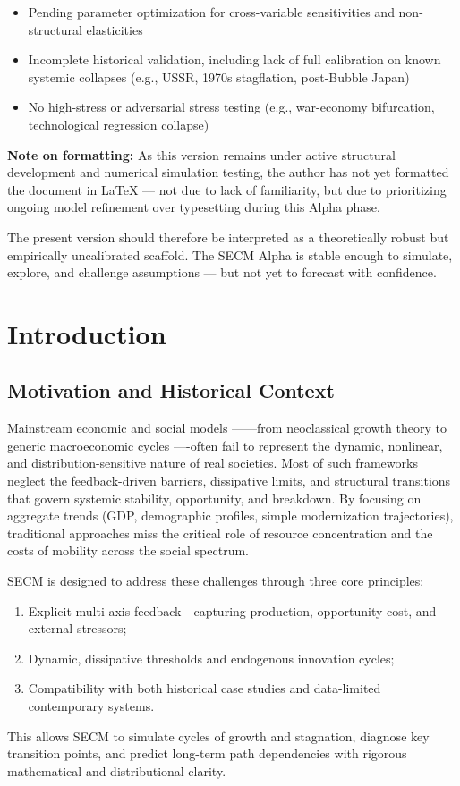 \documentclass[12pt]{report}
\begin{document}
\begin{itemize}
    \item Pending parameter optimization for cross-variable sensitivities and non-structural elasticities
    \item Incomplete historical validation, including lack of full calibration on known systemic collapses (e.g., USSR, 1970s stagflation, post-Bubble Japan)
    \item No high-stress or adversarial stress testing (e.g., war-economy bifurcation, technological regression collapse)
\end{itemize}

\textbf{Note on formatting:} As this version remains under active structural development and numerical simulation testing, the author has not yet formatted the document in \LaTeX{} --- not due to lack of familiarity, but due to prioritizing ongoing model refinement over typesetting during this Alpha phase.

The present version should therefore be interpreted as a theoretically robust but empirically uncalibrated scaffold. The SECM Alpha is stable enough to simulate, explore, and challenge assumptions --- but not yet to forecast with confidence.
\section{Introduction}

\subsection{Motivation and Historical Context}
Mainstream economic and social models ------from neoclassical growth theory to generic macroeconomic cycles ----often fail to represent the dynamic, nonlinear, and distribution-sensitive nature of real societies. Most of such frameworks neglect the feedback-driven barriers, dissipative limits, and structural transitions that govern systemic stability, opportunity, and breakdown. By focusing on aggregate trends (GDP, demographic profiles, simple modernization trajectories), traditional approaches miss the critical role of resource concentration and the costs of mobility across the social spectrum.

SECM is designed to address these challenges through three core principles:
\begin{enumerate}
  \item Explicit multi-axis feedback---capturing production, opportunity cost, and external stressors;
  \item Dynamic, dissipative thresholds and endogenous innovation cycles;
  \item Compatibility with both historical case studies and data-limited contemporary systems.
\end{enumerate}
This allows SECM to simulate cycles of growth and stagnation, diagnose key transition points, and predict long-term path dependencies with rigorous mathematical and distributional clarity.
\end{document}
